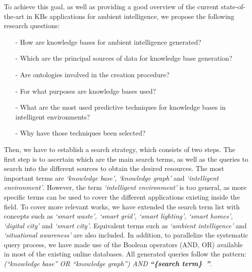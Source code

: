 To achieve this goal, as well as providing a good overview of the current state-of-the-art in KBs applications for ambient intelligence, we propose the following research questions:

\begin{itemize}                            
\item[-] {How are knowledge bases for ambient intelligence generated?}
\item[-] {Which are the principal sources of data for knowledge base generation?}
\item[-] {Are ontologies involved in the creation procedure?}
\item[-] {For what purposes are knowledge bases used?}
\item[-] {What are the most used predictive techniques for knowledge bases in intelligent environments?}
\item[-] {Why have those techniques been selected?}
\end{itemize} 

 
 
 
Then, we have to establish a search strategy, which consists of two steps. The first step is to ascertain which are the main search terms, as well as the queries to search into the different sources to obtain the desired resources. The most important terms are \textit{`knowledge base', `knowledge graph'} and \textit{`intelligent environment'}. However, the term \textit{`intelligent environment'} is too general, as more specific terms can be used to cover the different applications existing inside the field. To cover more relevant works, we have extended the search term list with concepts such as \textit{`smart waste', `smart grid', `smart lighting', `smart homes', `digital city'} and \textit{`smart city'}. Equivalent terms such as \textit{`ambient intelligence'} and \textit{`situational awareness'} are also included. In addition, to parallelize the systematic query process, we have made use of the Boolean operators (AND, OR) available in most of the existing online databases. All generated queries follow the pattern: \textit{(``knowledge base'' OR ``knowledge graph'') AND \textbf{``\{search term\}~''}}.

